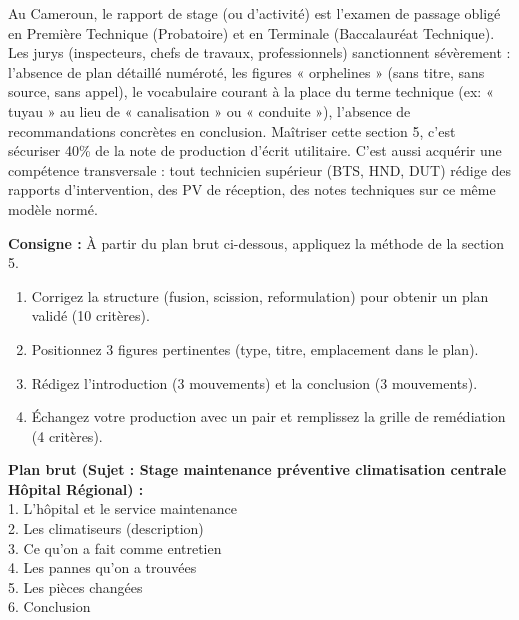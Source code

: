\documentclass[11pt]{article}
\begin{document}
\begin{savaistu}
Au Cameroun, le rapport de stage (ou d'activité) est l'examen de passage obligé en Première Technique (Probatoire) et en Terminale (Baccalauréat Technique). Les jurys (inspecteurs, chefs de travaux, professionnels) sanctionnent sévèrement : l'absence de plan détaillé numéroté, les figures « orphelines » (sans titre, sans source, sans appel), le vocabulaire courant à la place du terme technique (ex: « tuyau » au lieu de « canalisation » ou « conduite »), l'absence de recommandations concrètes en conclusion. Maîtriser cette section 5, c'est sécuriser 40\% de la note de production d'écrit utilitaire. C'est aussi acquérir une compétence transversale : tout technicien supérieur (BTS, HND, DUT) rédige des rapports d'intervention, des PV de réception, des notes techniques sur ce même modèle normé.
\end{savaistu}

\begin{exercice}
\textbf{Consigne :} À partir du plan brut ci-dessous, appliquez la méthode de la section 5.
\begin{enumerate}
    \item Corrigez la structure (fusion, scission, reformulation) pour obtenir un plan validé (10 critères).
    \item Positionnez 3 figures pertinentes (type, titre, emplacement dans le plan).
    \item Rédigez l'introduction (3 mouvements) et la conclusion (3 mouvements).
    \item Échangez votre production avec un pair et remplissez la grille de remédiation (4 critères).
\end{enumerate}

\textbf{Plan brut (Sujet : Stage maintenance préventive climatisation centrale Hôpital Régional) :} \\
1. L'hôpital et le service maintenance \\
2. Les climatiseurs (description) \\
3. Ce qu'on a fait comme entretien \\
4. Les pannes qu'on a trouvées \\
5. Les pièces changées \\
6. Conclusion
\end{exercice}
\end{document}
